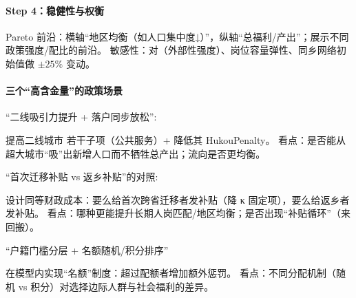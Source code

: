 \documentclass[
  a4paper,
  zihao=-4,
  fontset=mac,
  AutoFakeBold,
  AutoFakeSlant,
  oneside]{ctexbook}
\begin{document}
\paragraph{Step 4：稳健性与权衡}

Pareto 前沿：横轴“地区均衡（如人口集中度↓）”，纵轴“总福利/产出”；展示不同政策强度/配比的前沿。
敏感性：对（外部性强度）、岗位容量弹性、同乡网络初始值做 $\pm 25\%$ 变动。

\paragraph{三个“高含金量”的政策场景}

“二线吸引力提升 + 落户同步放松”:

提高二线城市  若干子项（公共服务）+ 降低其 HukouPenalty。
看点：是否能从超大城市“吸”出新增人口而不牺牲总产出；流向是否更均衡。

“首次迁移补贴 vs 返乡补贴”的对照:

设计同等财政成本：要么给首次跨省迁移者发补贴（降 
κ 固定项），要么给返乡者发补贴。
看点：哪种更能提升长期人岗匹配/地区均衡；是否出现“补贴循环”（来回搬）。

“户籍门槛分层 + 名额随机/积分排序”

在模型内实现“名额”制度：超过配额者增加额外惩罚。
看点：不同分配机制（随机 vs 积分）对选择边际人群与社会福利的差异。








\end{document}
